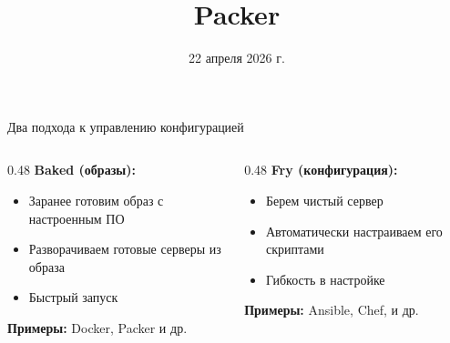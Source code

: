 \documentclass[aspectratio=169]{beamer}
\title{Packer}
\date{22 апреля 2026 г. }
\begin{document}
    \maketitle

    \begin{frame}{Два подхода к управлению конфигурацией}
        \begin{columns}[t]
            \begin{column}[t]{0.48\textwidth}
                \textbf{Baked (образы):}
                \begin{itemize}
                    \item Заранее готовим образ с настроенным ПО
                    \item Разворачиваем готовые серверы из образа
                    \item Быстрый запуск
                \end{itemize}
                
                \vspace{0.3cm}
                \textbf{Примеры:} Docker, Packer и др.
            \end{column}
            
            \begin{column}[t]{0.48\textwidth}
                \textbf{Fry (конфигурация):}
                \begin{itemize}
                    \item Берем чистый сервер
                    \item Автоматически настраиваем его скриптами
                    \item Гибкость в настройке
                \end{itemize}
                
                \vspace{0.3cm}
                \textbf{Примеры:} Ansible, Chef, и др.
            \end{column}
        \end{columns}
        
    \end{frame}
\end{document}
